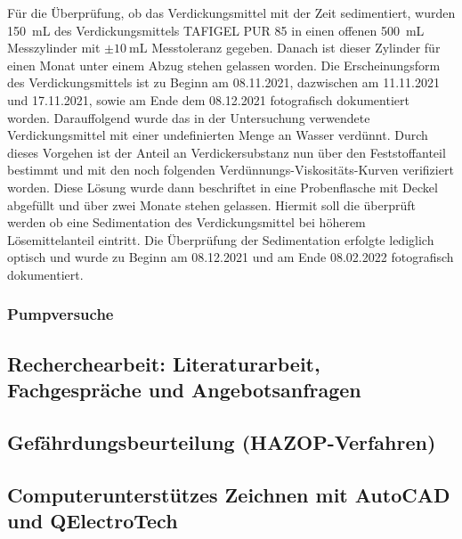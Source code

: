 Für die Überprüfung, ob das Verdickungsmittel mit der Zeit sedimentiert, wurden \SI{150}{\milli \liter} des Verdickungsmittels TAFIGEL PUR 85 in einen offenen \SI{500}{\milli \liter} Messzylinder mit $\pm \SI{10}{\milli \liter}$ Messtoleranz gegeben. Danach ist dieser Zylinder für einen Monat unter einem Abzug stehen gelassen worden. Die Erscheinungsform des Verdickungsmittels ist zu Beginn am 08.11.2021, dazwischen am 11.11.2021 und 17.11.2021, sowie am Ende dem 08.12.2021 fotografisch dokumentiert worden.\linebreak
Darauffolgend wurde das in der Untersuchung verwendete Verdickungsmittel mit einer undefinierten Menge an Wasser verdünnt. Durch dieses Vorgehen ist der Anteil an Verdickersubstanz nun über den Feststoffanteil bestimmt und mit den noch folgenden Verdünnungs-Viskositäts-Kurven verifiziert worden. Diese Lösung wurde dann beschriftet in eine Probenflasche mit Deckel abgefüllt und über zwei Monate stehen gelassen. Hiermit soll die überprüft werden ob eine Sedimentation des Verdickungsmittel bei höherem Lösemittelanteil eintritt. Die Überprüfung der Sedimentation erfolgte lediglich optisch und wurde zu Beginn am 08.12.2021 und am Ende 08.02.2022 fotografisch dokumentiert.

\subsubsection{Pumpversuche}

\subsection{Recherchearbeit: Literaturarbeit, Fachgespräche und Angebotsanfragen}

\subsection{Gefährdungsbeurteilung (HAZOP-Verfahren)}

\subsection{Computerunterstützes Zeichnen mit AutoCAD und QElectroTech}




